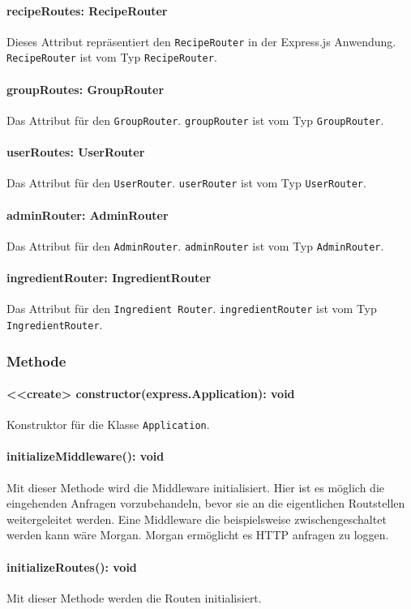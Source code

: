 \documentclass[parskip=full]{scrartcl}
\begin{document}
\paragraph{recipeRoutes: RecipeRouter}Dieses Attribut repräsentiert den \texttt{RecipeRouter} in der Express.js Anwendung. \texttt{RecipeRouter} ist vom Typ \texttt{RecipeRouter}.
\paragraph{groupRoutes: GroupRouter}Das Attribut für den \texttt{GroupRouter}. \texttt{groupRouter} ist vom Typ \texttt{GroupRouter}.
\paragraph{userRoutes: UserRouter}Das Attribut für den \texttt{UserRouter}. \texttt{userRouter} ist vom Typ \texttt{UserRouter}.
\paragraph{adminRouter: AdminRouter}Das Attribut für den \texttt{AdminRouter}. \texttt{adminRouter} ist vom Typ \texttt{AdminRouter}.
\paragraph{ingredientRouter: IngredientRouter}Das Attribut für den \texttt{Ingredient Router}. \texttt{ingredientRouter} ist vom Typ \texttt{IngredientRouter}.

\subsubsection*{Methode}
\paragraph{<<create> constructor(express.Application): void}Konstruktor für die Klasse \texttt{Application}.
\paragraph{initializeMiddleware(): void}Mit dieser Methode wird die Middleware initialisiert. Hier ist es möglich die eingehenden Anfragen vorzubehandeln, bevor sie an die eigentlichen Routstellen weitergeleitet werden.
Eine Middleware die beispielsweise zwischengeschaltet werden kann wäre Morgan. Morgan ermöglicht es HTTP anfragen zu loggen.
\paragraph{initializeRoutes(): void}Mit dieser Methode werden die Routen initialisiert.
\end{document}
